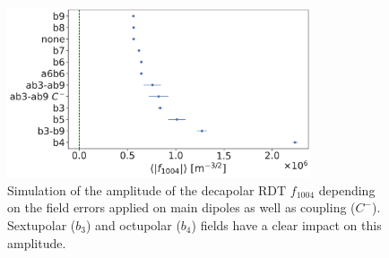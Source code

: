 \begin{figure}[!htb]
    \centering
    \includegraphics[width=0.8\textwidth]{./images/f1004/f1004_several_factors.pdf}
    \caption{Simulation of the amplitude of the decapolar RDT $f_{1004}$ depending on the field
             errors applied on main dipoles as well as coupling ($C^-$). Sextupolar ($b_3$) and
             octupolar ($b_4$) fields have a clear impact on this amplitude.}
    \label{fig:decapoles:rdts:contributions}
\end{figure}


%
%


\FloatBarrier
